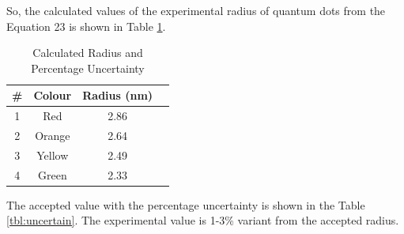 \documentclass[12pt]{report}
\begin{document}
So, the calculated values of the experimental radius of quantum dots from the Equation 23 is shown in Table \ref{tbl:radius}.

\begin{table}[]
\centering
\begin{tabular}{|c|c|c|l|}
\hline
\textbf{\#} & \textbf{Colour} & \textbf{Radius (nm)}  \\ \hline
1          & Red             & 2.86                   \\ \hline
2          & Orange          & 2.64                \\ \hline
3          & Yellow          & 2.49                \\ \hline
4          & Green           & 2.33                 \\ \hline
\end{tabular}
\caption{Calculated Radius and Percentage Uncertainty }
\label{tbl:radius}
\end{table}

The accepted value with the percentage uncertainty is shown in the Table \ref{tbl:uncertain}. The experimental value is 1-3\% variant from the accepted radius.
\end{document}
